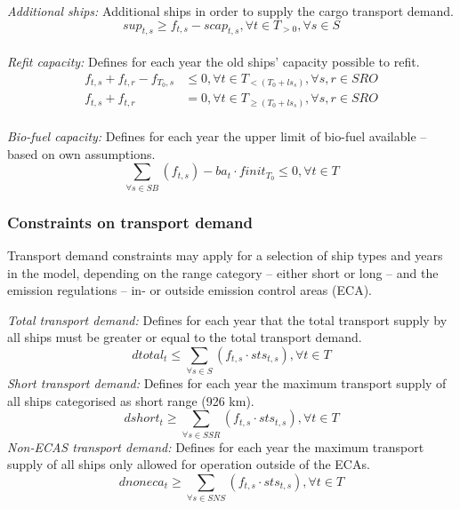 \documentclass[article]{elsarticle}
\begin{document}
\textit{Additional ships: }Additional ships in order to supply the cargo transport demand.
\begin{equation}
    sup_{t,s} \geq f_{t,s} - scap_{t,s}, \forall t \in T_{>0}, \forall s \in S\label{eq:sup}
\end{equation}\\
\textit{Refit capacity: }Defines for each year the old ships' capacity possible to refit.
\begin{subequations}\label{eq:refitships}
    \begin{align}
    f_{t,s} + f_{t,r} - f_{T_0, s} &\leq 0, \forall t \in T_{<\left(T_0+ls_{s}\right)}, \forall s, r \in SRO\\
    f_{t,s} + f_{t,r} & = 0, \forall t \in T_{\geq\left(T_0+ls_{s}\right)}, \forall s, r \in SRO
    \end{align}
\end{subequations}\\
\textit{Bio-fuel capacity: }Defines for each year the upper limit of bio-fuel available -- based on own assumptions.
\begin{equation}
    \sum_{\forall s \in SB} \left(f_{t,s} \right) - ba_{t}\cdot finit_{T_0} \leq 0, \forall t \in T\label{eq:biofuel}
\end{equation}

\subsubsection{Constraints on transport demand}
\label{subsubsec:tdemand}
Transport demand constraints may apply for a selection of ship types and years in the model, depending on the range category -- either short or long -- and the emission regulations -- in- or outside emission control areas (ECA).\\\par\noindent
\textit{Total transport demand: }Defines for each year that the total transport supply by all ships must be greater or equal to the total transport demand.
\begin{equation}
    dtotal_t \leq \sum_{\forall s \in S} \left( f_{t,s} \cdot sts_{t,s}\right), \forall t \in T \label{eq:td_total}
\end{equation}
\textit{Short transport demand: }Defines for each year the maximum transport supply of all ships categorised as short range (926 km).
\begin{equation}
    dshort_t \geq \sum_{\forall s \in SSR} \left( f_{t,s} \cdot sts_{t,s}\right), \forall t \in T \label{eq:td_short}
\end{equation}
\textit{Non-ECAS transport demand: }Defines for each year the maximum transport supply of all ships only allowed for operation outside of the ECAs.
\begin{equation}
    dnoneca_t \geq \sum_{\forall s \in SNS} \left( f_{t,s} \cdot sts_{t,s}\right), \forall t \in T \label{eq:td_noneca}
\end{equation}
\end{document}
